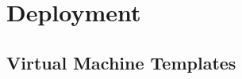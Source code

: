 \chapter{Deployment}\label{ch:deployment}

\section{Virtual Machine Templates}\label{sec:vm-templates}
